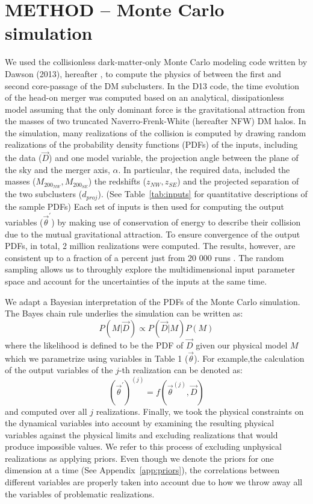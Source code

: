 \section{METHOD -- Monte Carlo simulation} 
%
We used the collisionless 
dark-matter-only Monte Carlo modeling code written by Dawson (2013),
hereafter , to compute the physics of between
the first and second core-passage of the DM subclusters. 
In the D13 code, the time evolution of the
head-on merger was computed based on an analytical, dissipationless model
assuming that the only dominant force is the gravitational attraction from
the masses of two truncated Naverro-Frenk-White (hereafter NFW) DM halos. 
In the simulation, many realizations of the collision is
computed by drawing random realizations of the probability density
functions (PDFs) of the inputs, including
the data ($\vec{D}$) and one model variable, the projection angle between
the plane of the sky and the merger axis, $\alpha$. In particular,
the required data, included the masses ($M_{200_{NW}},M_{200_{SE}}$) the
redshifts ($z_{NW}, z_{SE}$) and the projected separation of the two
subclusters ($d_{proj}$).  
(See Table~\ref{tab:inputs}
for quantitative descriptions of the sample PDFs) 
Each set of inputs is then used for computing the output variables
($\vec{\theta}^\prime$) by making use of conservation of energy to describe
their collision due to the mutual gravitational attraction.
To ensure convergence of the output PDFs, in total, 2 million realizations
were computed. 
The results, however, are consistent up to a fraction of a percent just
from 20 000 runs . The random sampling allows us to
throughly explore the multidimensional input parameter space and account
for the uncertainties of the inputs at the same time.
\par    


We adapt a Bayesian interpretation of the PDFs of the Monte Carlo
simulation. The Bayes chain rule underlies the simulation can be written as:
\begin{equation}
    P(M|\vec{D}) \propto P(\vec{D}|M)P(M)
\end{equation}
where the likelihood is defined to be the PDF of $\vec{D}$ given our
physical model $M$ which we parametrize using variables in Table 1
($\vec{\theta}$).
For example,the
calculation of the output variables of the $j$-th realization can be denoted as: 
\begin{equation}
    (\vec{\theta}^\prime)^{(j)} = f(\vec{\theta}^{(j)}, \vec{D}) 
\end{equation}    
and computed over all $j$ realizations. Finally, we took the physical
constraints on the dynamical variables into account by
examining the resulting physical variables against the physical limits and
excluding realizations that would produce impossible values. We refer to this
process of excluding unphysical realizations as applying priors. 
Even though we denote the priors for one dimension at a time (See Appendix~\ref{app:priors}), 
the correlations between different variables are properly taken into account
 due to how we throw away all the variables of problematic
realizations. 

